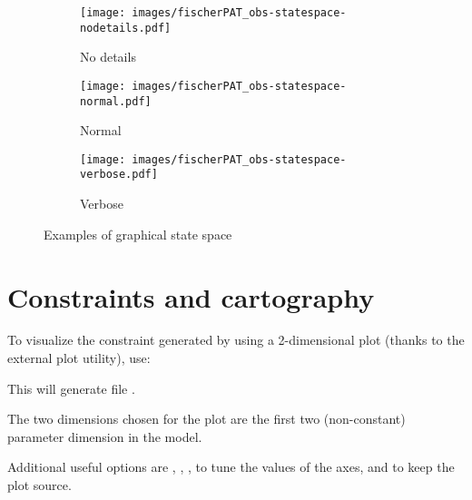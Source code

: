 \begin{figure}
	\centering
	\begin{subfigure}[b]{.48\textwidth}
		\texttt{[image: images/fischerPAT\_obs-statespace-nodetails.pdf]}

		\caption{No details}
		\label{figure:statespace:nodetail}
	\end{subfigure}
	\begin{subfigure}[b]{.48\textwidth}
		\texttt{[image: images/fischerPAT\_obs-statespace-normal.pdf]}

		\caption{Normal}
		\label{figure:statespace:normal}
	\end{subfigure}

	\begin{subfigure}[b]{.75\textwidth}
		\texttt{[image: images/fischerPAT\_obs-statespace-verbose.pdf]}

		\caption{Verbose}
		\label{figure:statespace:verbose}
	\end{subfigure}

	\caption{Examples of graphical state space}
\end{figure}



\section{Constraints and cartography}

To visualize the constraint generated by \imitator{} using a 2-dimensional plot (thanks to the external plot utility), use:


This will generate file .

The two dimensions chosen for the plot are the first two (non-constant) parameter dimension in the model.

Additional useful options are
,
,
,
to tune the values of the axes,
and  to keep the plot source.


